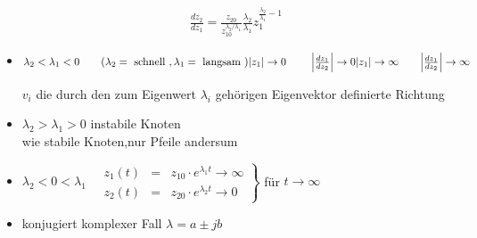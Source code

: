 \documentclass[11pt,a4paper]{article}
\begin{document}
\begin{itemize}
\begin{align}
{\frac{d z_2}{d z_1} = \frac{z_{20}}{z_{10}^{\lambda_2/\lambda_1}} \frac{\lambda_2}
{\lambda_1} z_1^{ \frac{\lambda_2}{\lambda_1} - 1 }
}
\tag{2.4}
\end{align}
\item $\lambda_2 < \lambda_1 < 0 \qquad (\lambda_2 = \text{ schnell } , \lambda_1 = \text{ langsam })\\
|z_1| \rightarrow 0 \qquad ~\Big|\frac{d z_1}{d z_2}\Big|\rightarrow 0\\
|z_1| \rightarrow \infty \qquad \Big|\frac{d z_1}{d z_2}\Big|\rightarrow \infty \\
$
\begin{figure}[H]  
  \centering
  \def\svgwidth{300pt} 
   
\end{figure} 
$v_i$ die durch den zum Eigenwert $\lambda_i$ gehörigen Eigenvektor definierte Richtung
\item $\lambda_2 > \lambda_1 > 0$ instabile Knoten \\wie stabile Knoten,nur Pfeile andersum
\item $\lambda_2 < 0 < \lambda_1 \quad \left.
\begin{matrix}
z_1(t) &=& z_{10}\cdot e^{\lambda_1 t} \rightarrow \infty \\
z_2(t) &=& z_{20}\cdot e^{\lambda_2 t} \rightarrow 0 
\end{matrix}
\right\}$ für $t\rightarrow \infty$ 
\begin{figure}[H]  
  \centering
  \def\svgwidth{300pt} 
   
\end{figure}
\item konjugiert komplexer Fall $\lambda = a \pm jb$
\begin{figure}[H]  
  \centering
  \def\svgwidth{300pt} 
   
\end{figure} 
\end{itemize} 
\end{document}
